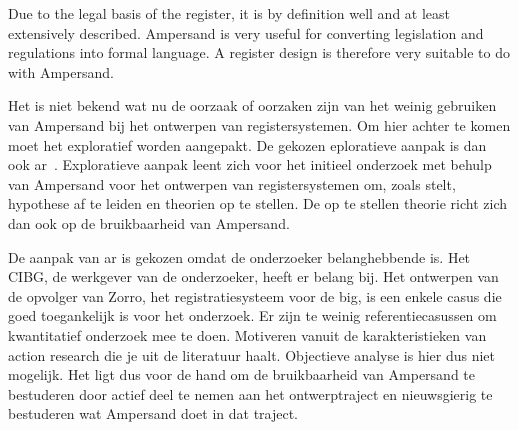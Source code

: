 Due to the legal basis of the register, it is by definition well and at least extensively described.
Ampersand is very useful for converting legislation and regulations into formal language.
A register design is therefore very suitable to do with Ampersand.

Het is niet bekend wat nu de oorzaak of oorzaken zijn van het weinig gebruiken van Ampersand bij het ontwerpen van registersystemen.
Om hier achter te komen moet het exploratief worden aangepakt.
De gekozen eploratieve aanpak is dan ook \acrfull{ar}~\citep{Easterbrook}.
Exploratieve aanpak leent zich voor het initieel onderzoek met behulp van Ampersand voor het ontwerpen van registersystemen om, zoals \cite{Easterbrook} stelt, hypothese af te leiden en theorien op te stellen.
De op te stellen theorie richt zich dan ook op de bruikbaarheid van Ampersand.

De aanpak van \acrshort{ar} is gekozen omdat de onderzoeker belanghebbende is. 
Het CIBG, de werkgever van de onderzoeker, heeft er belang bij. 
Het ontwerpen van de opvolger van Zorro, het registratiesysteem voor de \acrshort{big}, is een enkele casus die goed toegankelijk is voor het onderzoek. 
Er zijn te weinig referentiecasussen om kwantitatief onderzoek mee te doen. 
Motiveren vanuit de karakteristieken van action research die je uit de literatuur haalt. 
Objectieve analyse is hier dus niet mogelijk. 
Het ligt dus voor de hand om de bruikbaarheid van Ampersand te bestuderen door actief deel te nemen aan het ontwerptraject en nieuwsgierig te bestuderen wat Ampersand doet in dat traject.



